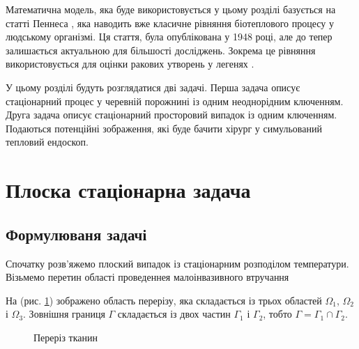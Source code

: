 Математична модель, яка буде використовується у цьому розділі базується на статті Пеннеса
\cite{thermal-process-tissue-pennes}, яка наводить вже класичне рівняння біотеплового процесу у людському організмі. Ця
стаття, була опублікована у 1948 році, але до тепер залишається актуальною для більшості досліджень. Зокрема це рівняння
використовується для оцінки ракових утворень у легенях \cite{lung-tumor-thermal-conductivity}.

У цьому розділі будуть розглядатися дві задачі. Перша задача описує стаціонарний процес у черевній порожнині із одним 
неоднорідним ключенням. Друга задача описує стаціонарний просторовий випадок із одним ключенням. Подаються потенційні 
зображення, які буде бачити хірург у симульований тепловий ендоскоп.

\section{Плоска стаціонарна задача}

\subsection{Формулюваня задачі}

Спочатку розв'яжемо плоский випадок із стаціонарним розподілом температури.
Візьмемо перетин області проведеннея малоінвазивного втручання

На (рис. \ref{fig:thermo_2d_domain}) зображено область перерізу, яка складається із трьох областей $\Omega_1$, 
$\Omega_2$ і $\Omega_3$. Зовнішня границя $\Gamma$ складається із двох частин $\Gamma_1$ і $\Gamma_2$, тобто 
$\Gamma=\Gamma_1\cap\Gamma_2$. 

\begin{figure}[ht!]
    \centering
    
    \caption{Переріз тканин}
    \label{fig:thermo_2d_domain}
\end{figure}

